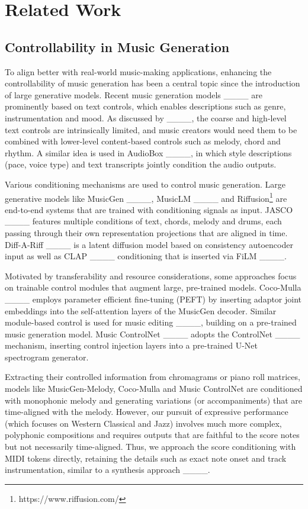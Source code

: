 \section{Related Work}
\subsection{Controllability in Music Generation}

To align better with real-world music-making applications, enhancing the controllability of music generation has been a central topic since the introduction of large generative models. Recent music generation models ____ are prominently based on text controls, which enables descriptions such as genre, instrumentation and mood. As discussed by ____, the coarse and high-level text controls are intrinsically limited, and music creators would need them to be combined with lower-level content-based controls such as melody, chord and rhythm. 
A similar idea is used in AudioBox ____, in which style descriptions (pace, voice type) and text transcripts jointly condition the audio outputs. 

Various conditioning mechanisms are used to control music generation. Large generative models like MusicGen ____, MusicLM ____ and Riffusion\footnote{https://www.riffusion.com/} are end-to-end systems that are trained with conditioning signals as input. JASCO ____ features multiple conditions of text, chords, melody and drums, each passing through their own representation projections that are aligned in time. Diff-A-Riff ____ is a latent diffusion model based on consistency autoencoder input as well as CLAP ____ conditioning that is inserted via FiLM ____.

Motivated by transferability and resource considerations, some approaches focus on trainable control modules that augment large, pre-trained models. Coco-Mulla ____ employs parameter efficient fine-tuning (PEFT) by inserting adaptor joint embeddings into the self-attention layers of the MusicGen decoder. Similar module-based control is used for music editing ____, building on a pre-trained music generation model. Music ControlNet ____ adopts the ControlNet ____ mechanism, inserting control injection layers into a pre-trained U-Net spectrogram generator. 

Extracting their controlled information from chromagrams or piano roll matrices, models like MusicGen-Melody, Coco-Mulla and Music ControlNet are conditioned with monophonic melody and generating variations (or accompaniments) that are time-aligned with the melody. However, our pursuit of expressive performance (which focuses on Western Classical and Jazz) involves much more complex, polyphonic compositions and requires outputs that are faithful to the score notes but not necessarily time-aligned. Thus, we approach the score conditioning with MIDI tokens directly, retaining the details such as exact note onset and track instrumentation, similar to a synthesis approach ____.


